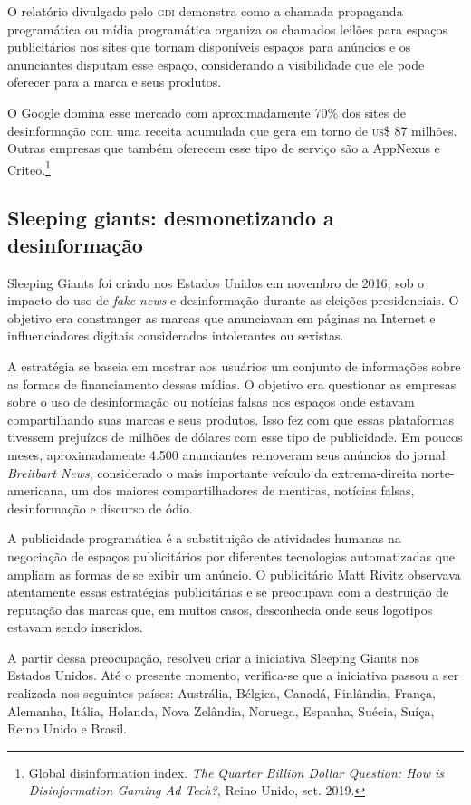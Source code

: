 O relatório divulgado pelo \textsc{gdi} demonstra como a chamada propaganda
programática ou mídia programática organiza os chamados leilões para
espaços publicitários nos sites que tornam disponíveis espaços para
anúncios e os anunciantes disputam esse espaço, considerando a
visibilidade que ele pode oferecer para a marca e seus produtos.

O Google domina esse mercado com aproximadamente 70\% dos sites de
desinformação com uma receita acumulada que gera em torno de \textsc{us}\$ 87
milhões. Outras empresas que também oferecem esse tipo de serviço são a
AppNexus e Criteo.\footnote{Global disinformation index. \textit{The Quarter Billion Dollar
Question: How is Disinformation Gaming Ad Tech?}, Reino Unido, set. 2019.}

\subsection{Sleeping giants: desmonetizando a desinformação}

Sleeping Giants foi criado nos Estados Unidos em novembro de 2016, sob o
impacto do uso de \textit{fake news} e desinformação durante as eleições
presidenciais. O objetivo era constranger as marcas que anunciavam em
páginas na Internet e influenciadores digitais considerados intolerantes
ou sexistas.

A estratégia se baseia em mostrar aos usuários um conjunto de
informações sobre as formas de financiamento dessas mídias. O objetivo
era questionar as empresas sobre o uso de desinformação ou notícias
falsas nos espaços onde estavam compartilhando suas marcas e seus
produtos. Isso fez com que essas plataformas tivessem prejuízos de
milhões de dólares com esse tipo de publicidade. Em poucos meses,
aproximadamente 4.500 anunciantes removeram seus anúncios do jornal
\textit{Breitbart News}, considerado o mais importante veículo da extrema-direita norte-americana, um dos maiores compartilhadores de mentiras,
notícias falsas, desinformação e discurso de ódio.

A publicidade programática é a substituição de atividades humanas na
negociação de espaços publicitários por diferentes tecnologias
automatizadas que ampliam as formas de se exibir um anúncio. O
publicitário Matt Rivitz observava atentamente essas estratégias
publicitárias e se preocupava com a destruição de reputação das marcas
que, em muitos casos, desconhecia onde seus logotipos estavam sendo
inseridos.

A partir dessa preocupação, resolveu criar a iniciativa Sleeping Giants
nos Estados Unidos. Até o presente momento, verifica-se que a iniciativa
passou a ser realizada nos seguintes países: Austrália, Bélgica,
Canadá, Finlândia, França, Alemanha, Itália, Holanda, Nova Zelândia,
Noruega, Espanha, Suécia, Suíça, Reino Unido e Brasil.


